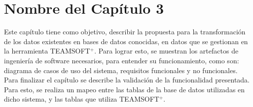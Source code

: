 \chapter{Nombre del Capítulo 3} \label{chap:3}

Este capítulo tiene como objetivo, describir la propuesta para la transformación de los datos existentes en bases de datos conocidas, en datos que se gestionan en la herramienta TEAMSOFT$^+$. Para lograr esto, se muestran los artefactos de ingeniería de software necesarios, para entender su funcionamiento, como son: diagrama de casos de uso del sistema, requisitos funcionales y no funcionales. Para finalizar el capítulo se describe la validación de la funcionalidad presentada. Para esto, se realiza un mapeo entre las tablas de la base de datos utilizadas en dicho sistema, y las tablas que utiliza TEAMSOFT$^+$.


